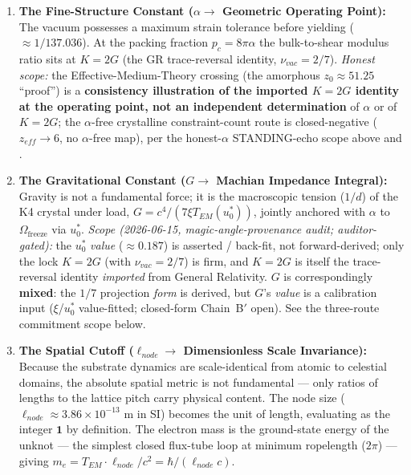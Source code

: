 \begin{enumerate}
    \item \textbf{The Fine-Structure Constant ($\alpha \to$ Geometric Operating Point):} The vacuum possesses a maximum strain tolerance before yielding ($\approx 1/137.036$). At the packing fraction $p_c = 8\pi\alpha$ the bulk-to-shear modulus ratio sits at $K = 2G$ (the GR trace-reversal identity, $\nu_{vac} = 2/7$). \emph{Honest scope:} the Effective-Medium-Theory crossing (the amorphous $z_0 \approx 51.25$ ``proof'') is a \textbf{consistency illustration of the imported $K = 2G$ identity at the operating point, not an independent determination} of $\alpha$ or of $K = 2G$; the $\alpha$-free crystalline constraint-count route is closed-negative ($z_{eff} \to 6$, no $\alpha$-free map), per the honest-$\alpha$ STANDING-echo scope above and .

    \item \textbf{The Gravitational Constant ($G \to$ Machian Impedance Integral):} Gravity is not a fundamental force; it is the macroscopic tension ($1/d$) of the K4 crystal under load, $G = c^4 / (7\xi T_{EM}(u_0^*))$, jointly anchored with $\alpha$ to $\Omega_{\text{freeze}}$ via $u_0^*$. \emph{Scope (2026-06-15, magic-angle-provenance audit; auditor-gated):} the $u_0^*$ \emph{value} ($\approx 0.187$) is asserted / back-fit, not forward-derived; only the lock $K = 2G$ (with $\nu_{vac} = 2/7$) is firm, and $K = 2G$ is itself the trace-reversal identity \emph{imported} from General Relativity. $G$ is correspondingly \textbf{mixed}: the $1/7$ projection \emph{form} is derived, but $G$'s \emph{value} is a calibration input ($\xi$/$u_0^*$ value-fitted; closed-form Chain~B$'$ open). See the three-route commitment scope below.

    \item \textbf{The Spatial Cutoff ($\ell_{node} \to$ Dimensionless Scale Invariance):} Because the substrate dynamics are scale-identical from atomic to celestial domains, the absolute spatial metric is not fundamental --- only ratios of lengths to the lattice pitch carry physical content. The node size ($\ell_{node} \approx 3.86 \times 10^{-13}$ m in SI) becomes the unit of length, evaluating as the integer $\mathbf{1}$ by definition. The electron mass is the ground-state energy of the unknot --- the simplest closed flux-tube loop at minimum ropelength ($2\pi$) --- giving $m_e = T_{EM} \cdot \ell_{node} / c^2 = \hbar / (\ell_{node} c)$.
\end{enumerate}

